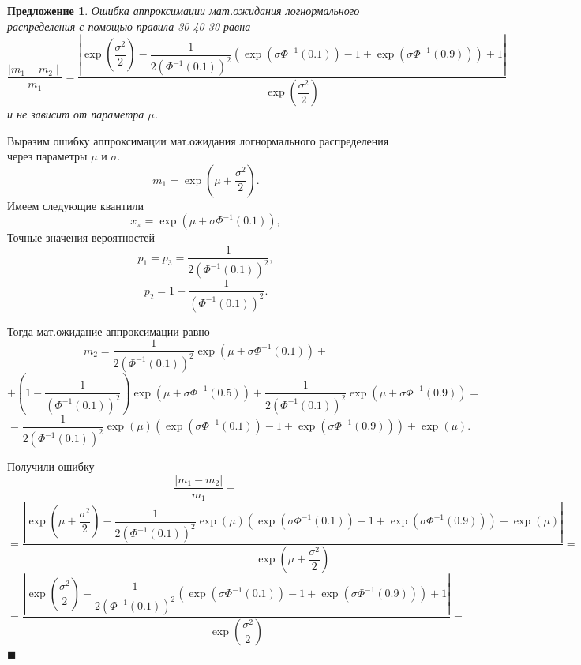 \documentclass[12pt]{article}
\newtheorem{proposition}[theorem]{Предложение}
\newenvironment{Proof}{\par\noindent{\bf Доказательство.}}{\hfill$\scriptstyle\blacksquare$}
\begin{document}
\begin{proposition}\label{pr5}
	Ошибка аппроксимации мат.ожидания логнормального распределения с помощью правила 30-40-30 равна
	\[\dfrac{\mid m_{1} - m_{2} \mid}{m_{1}} = \dfrac{\left|\exp\left(\dfrac{\sigma^{2}}{2}\right) - \dfrac{1}{2(\Phi^{-1}(0.1))^{2}}\left(\exp(\sigma\Phi^{-1}(0.1))-1 +\exp(\sigma\Phi^{-1}(0.9))\right) + 1\right|}{\exp\left(\dfrac{\sigma^{2}}{2}\right)}\]
	и не зависит от параметра $\mu$.
\end{proposition}
\begin{Proof}
	Выразим ошибку аппроксимации мат.ожидания логнормального распределения через параметры $\mu$ и $\sigma$.
	\[m_{1} = \exp\left(\mu+\dfrac{\sigma^{2}}{2}\right).\]
	Имеем следующие квантили
	\[x_{\pi} = \exp(\mu+\sigma\Phi^{-1}(0.1)),\]
	Точные значения вероятностей
	\[p_{1} = p_{3} = \dfrac{1}{2(\Phi^{-1}(0.1))^{2}},\]
	\[p_{2} = 1 - \dfrac{1}{(\Phi^{-1}(0.1))^{2}}.\]
	
	Тогда мат.ожидание аппроксимации равно
	\[m_{2} = \dfrac{1}{2(\Phi^{-1}(0.1))^{2}}\exp(\mu+\sigma\Phi^{-1}(0.1))+\]
	\[+\left(1 - \dfrac{1}{(\Phi^{-1}(0.1))^{2}}\right)\exp(\mu+\sigma\Phi^{-1}(0.5))+ \dfrac{1}{2(\Phi^{-1}(0.1))^{2}}\exp(\mu+\sigma\Phi^{-1}(0.9))=\]
	\[= \dfrac{1}{2(\Phi^{-1}(0.1))^{2}} \exp(\mu)(\exp(\sigma\Phi^{-1}(0.1))-1+\exp(\sigma\Phi^{-1}(0.9))) + \exp(\mu). \]
	
	Получили ошибку
	\[\dfrac{\left| m_{1} - m_{2} \right|}{m_{1}} = \]\[=\dfrac{\left| \exp\left(\mu+\dfrac{\sigma^{2}}{2}\right) - \dfrac{1}{2(\Phi^{-1}(0.1))^{2}} \exp(\mu)(\exp(\sigma\Phi^{-1}(0.1))-1 +\exp(\sigma\Phi^{-1}(0.9))) + \exp(\mu) \right|}{\exp\left(\mu+\dfrac{\sigma^{2}}{2}\right)}=\]
	\[=\dfrac{\left| \exp\left(\dfrac{\sigma^{2}}{2}\right) - \dfrac{1}{2(\Phi^{-1}(0.1))^{2}} (\exp(\sigma\Phi^{-1}(0.1))-1 +\exp(\sigma\Phi^{-1}(0.9))) + 1 \right|}{\exp\left(\dfrac{\sigma^{2}}{2}\right)}=\]
\end{Proof}
\end{document}
